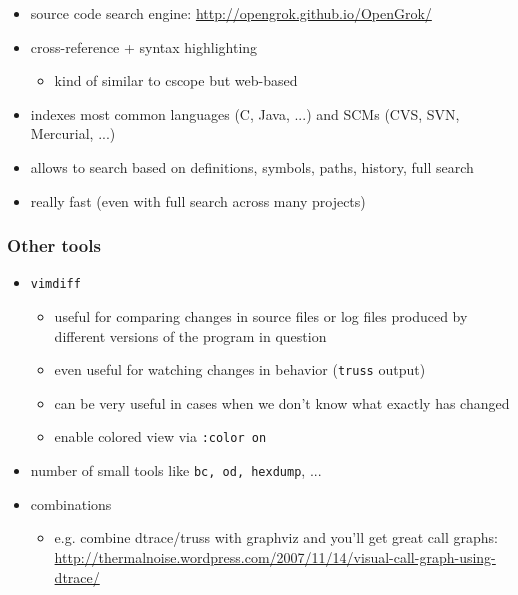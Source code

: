 \begin{itemize}
  \item source code search engine: \url{http://opengrok.github.io/OpenGrok/}
  \item cross-reference + syntax highlighting
    \begin{itemize}
    \item kind of similar to cscope but web-based
    \end{itemize}
  \item indexes most common languages (C, Java, ...)
    and SCMs (CVS, SVN, Mercurial, ...)
  \item allows to search based on definitions, symbols, paths, history, full
  search
  \item really fast (even with full search across many projects)
\end{itemize}

\subsubsection{Other tools}

\begin{itemize}
  \item \texttt{vimdiff}
    \begin{itemize}
    \item useful for comparing changes in source files or log files produced
      by different versions of the program in question
      \item even useful for watching changes in behavior
        (\texttt{truss} output)
      \item can be very useful in cases when we don't know what exactly
        has changed
    \item enable colored view via \texttt{:color on}
    \end{itemize}
  \item number of small tools like \texttt{bc, od, hexdump}, ...
  \item combinations
    \begin{itemize}
      \item e.g. combine dtrace/truss with graphviz and you'll get great
        call graphs:
          \url{http://thermalnoise.wordpress.com/2007/11/14/visual-call-graph-using-dtrace/}
    \end{itemize}
\end{itemize}

